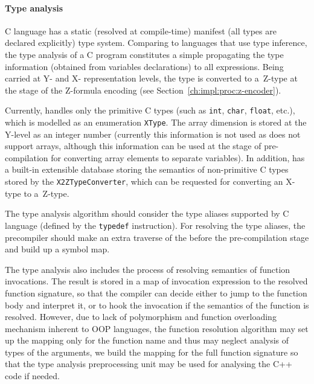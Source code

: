\paragraph{Type analysis}
\label{ch:impl:proc:x-pre-compiler:type}

C language has a static (resolved at compile-time) manifest (all types are declared explicitly) type system.
Comparing to languages that use type inference, the type analysis of a C program constitutes a simple propagating the type information (obtained from variables declarations) to all expressions. %
Being carried at Y- and X- representation levels, the type is converted to a~Z-type at the stage of the Z-formula encoding (see Section~\ref{ch:impl:proc:z-encoder}).

Currently, \porthos[2] handles only the primitive C types (such as \texttt{int}, \texttt{char}, \texttt{float}, etc.), which is modelled as an enumeration \texttt{XType}. %
The array dimension is stored at the Y-level as an integer number (currently this information is not used as \porthos[2] does not support arrays, although this information can be used at the stage of pre-compilation for converting array elements to separate variables). %
In addition, \porthos[2] has a built-in extensible database storing the semantics of non-primitive C types stored by the \texttt{X2ZTypeConverter}, %
which can be requested for converting an X-type to a~Z-type. %


The type analysis algorithm should consider the type aliases supported by C language (defined by the \texttt{typedef} instruction).
For resolving the type aliases, the precompiler should make an extra traverse of the \ytree{} before the pre-compilation stage and build up a symbol map.

The type analysis also includes the process of resolving semantics of function invocations.
The result is stored in a map of invocation expression to the resolved function signature, so that the compiler can decide either to jump to the function body and interpret it, or to hook the invocation if the semantics of the function is resolved.
However, due to lack of polymorphism and function overloading mechanism inherent to OOP languages, the function resolution algorithm may set up the mapping only for the function name and thus may neglect analysis of types of the arguments, we build the mapping for the full function signature so that the type analysis preprocessing unit may be used for analysing the C++ code if needed.


